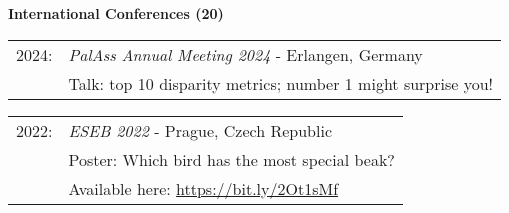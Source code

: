 \documentclass[10pt,a4paper]{article}
\begin{document}
{\bigskip

\raggedright\textbf{International Conferences (20)}\\[1.5ex]


\begin{tabular}{ll}
2024: & \textit{PalAss Annual Meeting 2024} - Erlangen, Germany\\
      & Talk: top 10 disparity metrics; number 1 might surprise you!\\
\end{tabular}

\begin{tabular}{ll}
2022: & \textit{ESEB 2022} - Prague, Czech Republic\\
      & Poster: Which bird has the most special beak?\\
      & Available here: \href{https://figshare.com/articles/Shifting_spaces_which_disparity_or_dissimilarity_metrics_best_summarise_occupancy_in_multidimensional_spaces_/9922961}{https://bit.ly/2Ot1sMf}\\
\end{tabular}

}
\end{document}
